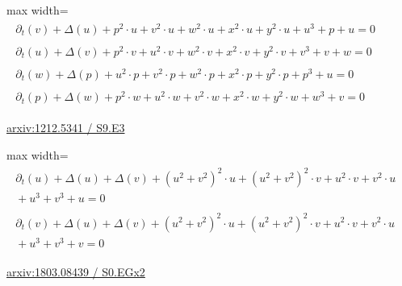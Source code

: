 \documentclass[UTF8,10pt,a4paper,fontset=mac]{ctexart}
\begin{document}
\begin{minipage}{\linewidth}\begin{center}\begin{adjustbox}{max width=\linewidth}$\displaystyle\begin{gathered}\begin{gathered}\partial_{t}(v)+\Delta(u)+p^{2}\cdot u+v^{2}\cdot u+w^{2}\cdot u+x^{2}\cdot u+y^{2}\cdot u+u^{3}+p+u=0\end{gathered}\\[5pt]\begin{gathered}\partial_{t}(u)+\Delta(v)+p^{2}\cdot v+u^{2}\cdot v+w^{2}\cdot v+x^{2}\cdot v+y^{2}\cdot v+v^{3}+v+w=0\end{gathered}\\[5pt]\begin{gathered}\partial_{t}(w)+\Delta(p)+u^{2}\cdot p+v^{2}\cdot p+w^{2}\cdot p+x^{2}\cdot p+y^{2}\cdot p+p^{3}+u=0\end{gathered}\\[5pt]\begin{gathered}\partial_{t}(p)+\Delta(w)+p^{2}\cdot w+u^{2}\cdot w+v^{2}\cdot w+x^{2}\cdot w+y^{2}\cdot w+w^{3}+v=0\end{gathered}\end{gathered}$\end{adjustbox}\end{center}{\small\href{https://arxiv.org/html/1212.5341#S9.E3}{arxiv:1212.5341 / S9.E3}}\par\end{minipage}\par\vspace{6mm}

\begin{minipage}{\linewidth}\begin{center}\begin{adjustbox}{max width=\linewidth}$\displaystyle\begin{gathered}\begin{gathered}\partial_{t}(u)+\Delta(u)+\Delta(v)+(u^{2}+v^{2})^{2}\cdot u+(u^{2}+v^{2})^{2}\cdot v+u^{2}\cdot v+v^{2}\cdot u\\[-1pt]{}+u^{3}+v^{3}+u=0\end{gathered}\\[5pt]\begin{gathered}\partial_{t}(v)+\Delta(u)+\Delta(v)+(u^{2}+v^{2})^{2}\cdot u+(u^{2}+v^{2})^{2}\cdot v+u^{2}\cdot v+v^{2}\cdot u\\[-1pt]{}+u^{3}+v^{3}+v=0\end{gathered}\end{gathered}$\end{adjustbox}\end{center}{\small\href{https://arxiv.org/html/1803.08439#S0.EGx2}{arxiv:1803.08439 / S0.EGx2}}\par\end{minipage}\par\vspace{6mm}
\end{document}
